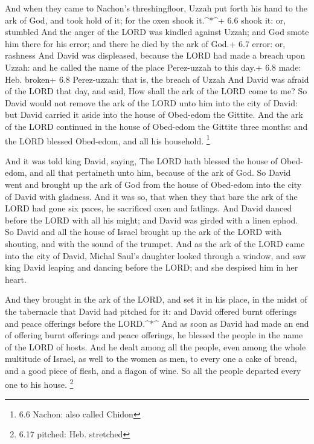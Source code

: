  And when they came to Nachon's threshingfloor, Uzzah put
forth his hand to the ark of God, and took hold of it; for the oxen
shook it.\^{}*\^{}+ 6.6 shook it: or, stumbled  And the
anger of the LORD was kindled against Uzzah; and God smote him there for
his error; and there he died by the ark of God.+ 6.7 error: or, rashness
 And David was displeased, because the LORD had made a
breach upon Uzzah: and he called the name of the place Perez-uzzah to
this day.+ 6.8 made: Heb. broken+ 6.8 Perez-uzzah: that is, the breach
of Uzzah  And David was afraid of the LORD that day, and
said, How shall the ark of the LORD come to me?  So David
would not remove the ark of the LORD unto him into the city of David:
but David carried it aside into the house of Obed-edom the Gittite.
 And the ark of the LORD continued in the house of
Obed-edom the Gittite three months: and the LORD blessed Obed-edom, and
all his household. \footnote{6.6 Nachon: also called Chidon}

 And it was told king David, saying, The LORD hath blessed
the house of Obed-edom, and all that pertaineth unto him, because of the
ark of God. So David went and brought up the ark of God from the house
of Obed-edom into the city of David with gladness.  And it
was so, that when they that bare the ark of the LORD had gone six paces,
he sacrificed oxen and fatlings.  And David danced before
the LORD with all his might; and David was girded with a linen ephod.
 So David and all the house of Israel brought up the ark of
the LORD with shouting, and with the sound of the trumpet. 
And as the ark of the LORD came into the city of David, Michal Saul's
daughter looked through a window, and saw king David leaping and dancing
before the LORD; and she despised him in her heart.

 And they brought in the ark of the LORD, and set it in his
place, in the midst of the tabernacle that David had pitched for it: and
David offered burnt offerings and peace offerings before the
LORD.\^{}*\^{}  And as soon as David had made an end of
offering burnt offerings and peace offerings, he blessed the people in
the name of the LORD of hosts.  And he dealt among all the
people, even among the whole multitude of Israel, as well to the women
as men, to every one a cake of bread, and a good piece of flesh, and a
flagon of wine. So all the people departed every one to his house.
\footnote{6.17 pitched: Heb. stretched}

